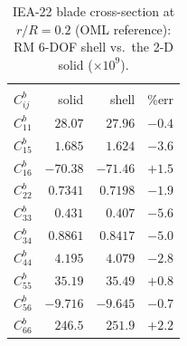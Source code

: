 \begin{table}[htpb]
\centering
\small
\caption{IEA-22 blade cross-section at $r/R=0.2$ (OML reference): RM 6-DOF shell vs.\ the 2-D solid ($\times10^{9}$).}
\label{tab:iea020}
\setlength{\tabcolsep}{4.5pt}
\begin{tabular}{l|rrr}
\hline
 & \multicolumn{3}{c}{} \\
$C^{b}_{ij}$ & solid & shell & \%err \\
\hline
$C^{b}_{11}$ & $28.07$ & $27.96$ & $-0.4$ \\
$C^{b}_{15}$ & $1.685$ & $1.624$ & $-3.6$ \\
$C^{b}_{16}$ & $-70.38$ & $-71.46$ & $+1.5$ \\
$C^{b}_{22}$ & $0.7341$ & $0.7198$ & $-1.9$ \\
$C^{b}_{33}$ & $0.431$ & $0.407$ & $-5.6$ \\
$C^{b}_{34}$ & $0.8861$ & $0.8417$ & $-5.0$ \\
$C^{b}_{44}$ & $4.195$ & $4.079$ & $-2.8$ \\
$C^{b}_{55}$ & $35.19$ & $35.49$ & $+0.8$ \\
$C^{b}_{56}$ & $-9.716$ & $-9.645$ & $-0.7$ \\
$C^{b}_{66}$ & $246.5$ & $251.9$ & $+2.2$ \\
\hline
\end{tabular}
\end{table}